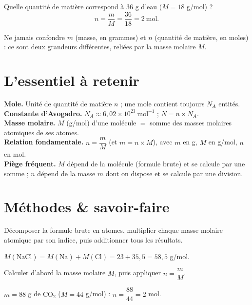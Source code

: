 \begin{exemple}
Quelle quantité de matière correspond à $36$ g d'eau ($M=18$ g/mol) ?
\[
n=\frac{m}{M}=\frac{36}{18}=2\ \text{mol}.
\]
\end{exemple}

\begin{remarque}
Ne jamais confondre $m$ (masse, en grammes) et $n$ (quantité de matière, en moles) : ce
sont deux grandeurs différentes, reliées par la masse molaire $M$.
\end{remarque}

\section{L'essentiel à retenir}

\begin{synthese}
\textbf{Mole.} Unité de quantité de matière $n$ ; une mole contient toujours $N_A$
entités.\\[4pt]
\textbf{Constante d'Avogadro.} $N_A\approx6{,}02\times10^{23}\ \text{mol}^{-1}$ ;
$N=n\times N_A$.\\[4pt]
\textbf{Masse molaire.} $M$ (g/mol) d'une molécule $=$ somme des masses molaires
atomiques de ses atomes.\\[4pt]
\textbf{Relation fondamentale.} $n=\dfrac mM$ (et $m=n\times M$), avec $m$ en g, $M$ en
g/mol, $n$ en mol.\\[4pt]
\textbf{Piège fréquent.} $M$ dépend de la molécule (formule brute) et se calcule par une
somme ; $n$ dépend de la masse $m$ dont on dispose et se calcule par une division.
\end{synthese}

\section{Méthodes \& savoir-faire}

Décomposer la formule brute en atomes, multiplier chaque masse molaire atomique par son
indice, puis additionner tous les résultats.
\begin{exemple}
$M(\mathrm{NaCl})=M(\mathrm{Na})+M(\mathrm{Cl})=23+35{,}5=58{,}5$ g/mol.
\end{exemple}

Calculer d'abord la masse molaire $M$, puis appliquer $n=\dfrac mM$.
\begin{exemple}
$m=88$ g de $\mathrm{CO_2}$ ($M=44$ g/mol) : $n=\dfrac{88}{44}=2$ mol.
\end{exemple}


